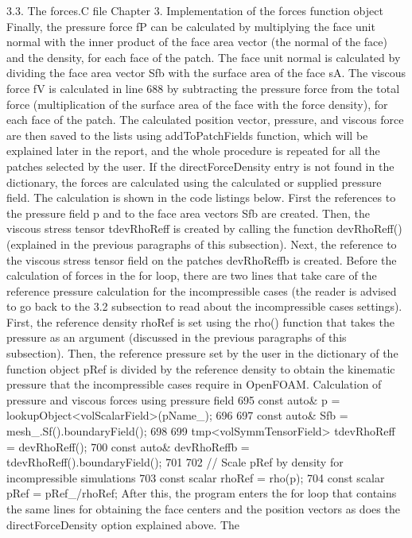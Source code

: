 {3.3. The forces.C file Chapter 3. Implementation of the forces function object
Finally, the pressure force fP can be calculated by multiplying the face unit normal with the
inner product of the face area vector (the normal of the face) and the density, for each face of the
patch. The face unit normal is calculated by dividing the face area vector Sfb with the surface
area of the face sA. The viscous force fV is calculated in line 688 by subtracting the pressure force
from the total force (multiplication of the surface area of the face with the force density), for each
face of the patch. The calculated position vector, pressure, and viscous force are then saved to the
lists using addToPatchFields function, which will be explained later in the report, and the whole
procedure is repeated for all the patches selected by the user.
If the directForceDensity entry is not found in the dictionary, the forces are calculated using
the calculated or supplied pressure field. The calculation is shown in the code listings below. First
the references to the pressure field p and to the face area vectors Sfb are created. Then, the viscous
stress tensor tdevRhoReff is created by calling the function devRhoReff() (explained in the previous
paragraphs of this subsection). Next, the reference to the viscous stress tensor field on the patches
devRhoReffb is created. Before the calculation of forces in the for loop, there are two lines that
take care of the reference pressure calculation for the incompressible cases (the reader is advised to
go back to the 3.2 subsection to read about the incompressible cases settings). First, the reference
density rhoRef is set using the rho() function that takes the pressure as an argument (discussed
in the previous paragraphs of this subsection). Then, the reference pressure set by the user in the
dictionary of the function object pRef is divided by the reference density to obtain the kinematic
pressure that the incompressible cases require in OpenFOAM.
Calculation of pressure and viscous forces using pressure field
695 const auto\& p = lookupObject<volScalarField>(pName\_);
696
697 const auto\& Sfb = mesh\_.Sf().boundaryField();
698
699 tmp<volSymmTensorField> tdevRhoReff = devRhoReff();
700 const auto\& devRhoReffb = tdevRhoReff().boundaryField();
701
702 // Scale pRef by density for incompressible simulations
703 const scalar rhoRef = rho(p);
704 const scalar pRef = pRef\_/rhoRef;
After this, the program enters the for loop that contains the same lines for obtaining the face
centers and the position vectors as does the directForceDensity option explained above. The
}
